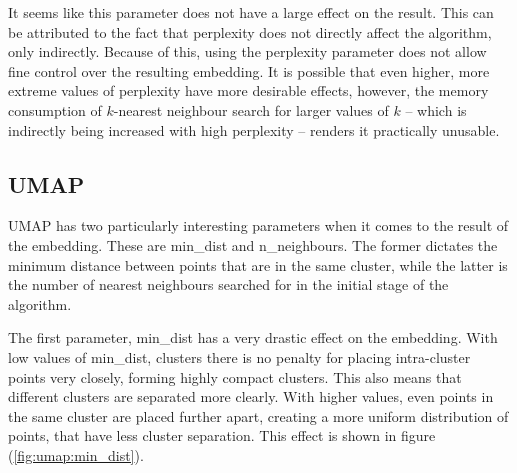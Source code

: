 It seems like this parameter does not have a large effect on the result. This can be attributed to the fact that perplexity does not directly affect the algorithm, only indirectly. Because of this, using the perplexity parameter does not allow fine control over the resulting embedding. It is possible that even higher, more extreme values of perplexity have more desirable effects, however, the memory consumption of $k$-nearest neighbour search for larger values of $k$ -- which is indirectly being increased with high perplexity -- renders it practically unusable.

\subsection{UMAP}


UMAP has two particularly interesting parameters when it comes to the result of the embedding. These are min\_dist and n\_neighbours. The former dictates the minimum distance between points that are in the same cluster, while the latter is the number of nearest neighbours searched for in the initial stage of the algorithm.

The first parameter, min\_dist has a very drastic effect on the embedding. With low values of min\_dist, clusters there is no penalty for placing intra-cluster points very closely, forming highly compact clusters. This also means that different clusters are separated more clearly. With higher values, even points in the same cluster are placed further apart, creating a more uniform distribution of points, that have less cluster separation. This effect is shown in figure (\ref{fig:umap:min_dist}).


